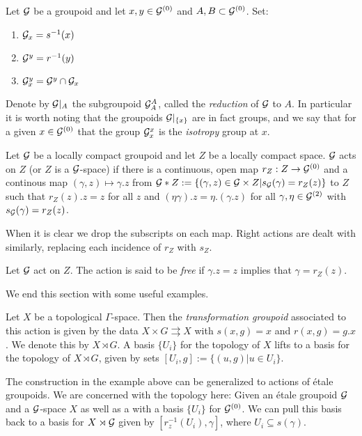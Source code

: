 \begin{definition}
Let $\mathcal{G}$ be a groupoid and let $x,y \in \mathcal{G}^{(0)}$ and $A,B \subset \mathcal{G}^{(0)}$. Set:
\begin{enumerate}
\item $\mathcal{G}_{x}=s^{-1}(x)$
\item $\mathcal{G}^{y}=r^{-1}(y)$
\item $\mathcal{G}^{y}_{x}=\mathcal{G}^{y} \cap \mathcal{G}_{x}$
\end{enumerate}
Denote by $\mathcal{G}|_{A}$ the subgroupoid $\mathcal{G}_{A}^{A}$, called the \textit{reduction} of $\mathcal{G}$ to $A$. In particular it is worth noting that the groupoids $\mathcal{G}|_{\lbrace x \rbrace}$ are in fact groups, and we say that for a given $x \in \mathcal{G}^{(0)}$ that the group $\mathcal{G}^{x}_{x}$ is the \textit{isotropy} group at $x$.
\end{definition}

\begin{definition}
Let $\mathcal{G}$ be a locally compact groupoid and let $Z$ be a locally compact space. $\mathcal{G}$ acts on $Z$ (or $Z$ is a $\mathcal{G}$-space) if there is a continuous, open map $r_{Z}: Z \rightarrow \mathcal{G}^{(0)}$ and a continous map $(\gamma, z) \mapsto \gamma .z$ from $\mathcal{G} \ast Z:= \lbrace (\gamma, z) \in \mathcal{G} \times Z | s_{\mathcal{G}}(\gamma)=r_{Z}(z)\rbrace$ to $Z$ such that $r_{Z}(z).z=z$ for all $z$ and $(\eta \gamma).z= \eta.(\gamma. z)$ for all $\gamma, \eta \in \mathcal{G}^{(2)}$ with $s_{\mathcal{G}}(\gamma)=r_{Z}(z)$.
\end{definition}

When it is clear we drop the subscripts on each map. Right actions are dealt with similarly, replacing each incidence of $r_{Z}$ with $s_{Z}$.

\begin{definition}
Let $\mathcal{G}$ act on $Z$. The action is said to be \textit{free} if $\gamma.z=z$ implies that $\gamma = r_{Z}(z)$.
\end{definition}
We end this section with some useful examples.

\begin{example}\label{Ex:TransGrp}
Let $X$ be a topological $\Gamma$-space. Then the \textit{transformation groupoid} associated to this action is given by the data $X \times G \rightrightarrows X$ with $s(x,g)=x$ and $r(x,g)=g.x$. We denote this by $X \rtimes G$. A basis $\lbrace U_{i} \rbrace$ for the topology of $X$ lifts to a basis for the topology of $X \rtimes G$, given by sets $[U_{i},g]:=\lbrace (u,g) | u \in U_{i} \rbrace$. 
\end{example}

\begin{example}
The construction in the example above can be generalized to actions of \'etale groupoids. We are concerned with the topology here: Given an \'etale groupoid $\mathcal{G}$ and a $\mathcal{G}$-space $X$ as well as a with a basis $\lbrace U_{i} \rbrace$ for $\mathcal{G}^{(0)}$. We can pull this basis back to a basis for $X \rtimes \mathcal{G}$ given by $[r_{z}^{-1}(U_{i}),\gamma]$, where $U_{i} \subseteq s(\gamma)$.
\end{example}

